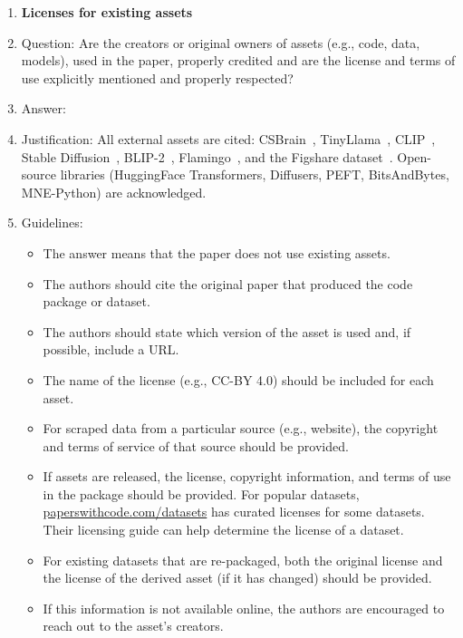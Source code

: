 \documentclass{article}
\begin{document}
\begin{enumerate}
\item {\bf Licenses for existing assets}
    \item[] Question: Are the creators or original owners of assets (e.g., code, data, models), used in the paper, properly credited and are the license and terms of use explicitly mentioned and properly respected?
    \item[] Answer: \answerYes{}
    \item[] Justification: All external assets are cited: CSBrain~\citep{zhu2024csbrain}, TinyLlama~\citep{zhang2024tinyllama}, CLIP~\citep{radford2021clip}, Stable Diffusion~\citep{rombach2022ldm}, BLIP-2~\citep{li2023blip2}, Flamingo~\citep{alayrac2022flamingo}, and the Figshare dataset~\citep{figshare_eeg}. Open-source libraries (HuggingFace Transformers, Diffusers, PEFT, BitsAndBytes, MNE-Python) are acknowledged.
    \item[] Guidelines:
    \begin{itemize}
        \item The answer \answerNA{} means that the paper does not use existing assets.
        \item The authors should cite the original paper that produced the code package or dataset.
        \item The authors should state which version of the asset is used and, if possible, include a URL.
        \item The name of the license (e.g., CC-BY 4.0) should be included for each asset.
        \item For scraped data from a particular source (e.g., website), the copyright and terms of service of that source should be provided.
        \item If assets are released, the license, copyright information, and terms of use in the package should be provided. For popular datasets, \url{paperswithcode.com/datasets} has curated licenses for some datasets. Their licensing guide can help determine the license of a dataset.
        \item For existing datasets that are re-packaged, both the original license and the license of the derived asset (if it has changed) should be provided.
        \item If this information is not available online, the authors are encouraged to reach out to the asset's creators.
    \end{itemize}


\end{enumerate}
\end{document}
